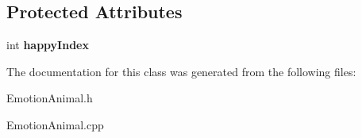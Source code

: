 \subsection*{Protected Attributes}
\begin{DoxyCompactItemize}
\item 
\mbox{\label{class_emotion_animal_a6619eb4ba696ac2892851cb3dacd863d}} 
int {\bfseries happy\+Index}
\end{DoxyCompactItemize}


The documentation for this class was generated from the following files\+:\begin{DoxyCompactItemize}
\item 
Emotion\+Animal.\+h\item 
Emotion\+Animal.\+cpp\end{DoxyCompactItemize}
